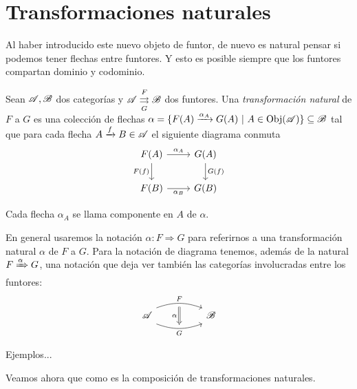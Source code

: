 \documentclass{comunicaciones}
\begin{document}
\section{Transformaciones naturales}

Al haber introducido este nuevo objeto de funtor, de nuevo es natural pensar si podemos tener flechas entre funtores. Y esto es posible siempre que los funtores
compartan dominio y codominio.

\begin{dfn}
    Sean $\mathscr A,\mathscr B$ dos categorías y $\mathscr A\overset{F}{\underset{G}{\rightrightarrows}}\mathscr B$ dos funtores. Una \emph{transformación natural} de $F$ a $G$
    es una colección de flechas $\alpha=\{F(A)\xrightarrow{\alpha_A}G(A) \ |\ A\in\Obj(\A)\}\subseteq\B$ tal que para cada flecha $A\xrightarrow{f}B\in\mathscr A$ el siguiente diagrama conmuta
    \[\begin{tikzcd}
        {F(A)} & {G(A)} \\
        {F(B)} & {G(B)}
        \arrow["{\alpha_A}", from=1-1, to=1-2]
        \arrow["{F(f)}"', from=1-1, to=2-1]
        \arrow["{G(f)}", from=1-2, to=2-2]
        \arrow["{\alpha_B}"', from=2-1, to=2-2]
    \end{tikzcd}\]

    Cada flecha $\alpha_A$ se llama componente en $A$ de $\alpha$.
\end{dfn}

En general usaremos la notación $\alpha:F\Rightarrow G$ para referirnos a una transformación natural $\alpha$ de $F$ a $G$. Para la notación de diagrama tenemos, además
de la natural $F\xRightarrow{\alpha}G$, una notación que deja ver también las categorías involucradas entre los funtores:
\[
\begin{tikzcd}
	\A && \B
	\arrow[""{name=0, anchor=center, inner sep=0}, "F", shift left=2, out=20, in=160, from=1-1, to=1-3]
	\arrow[""{name=1, anchor=center, inner sep=0}, "G"', shift right=2, out=340, in=200, from=1-1, to=1-3]
	\arrow["\alpha"', shorten <=3pt, shorten >=3pt, Rightarrow, from=0, to=1]
\end{tikzcd}
\]

Ejemplos... 

Veamos ahora que como es la composición de transformaciones naturales.
\end{document}
